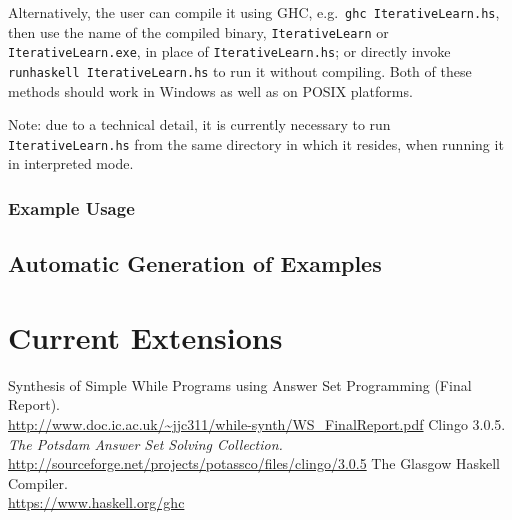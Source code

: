 \documentclass[a4paper,twoside,notitlepage,12pt]{article}
\begin{document}
\sloppy Alternatively, the user can compile it using GHC, e.g.\ 
\verb|ghc IterativeLearn.hs|, then use the name of the compiled binary,
\verb|IterativeLearn| or \verb|IterativeLearn.exe|, in place of
\verb|IterativeLearn.hs|; or directly invoke \verb|runhaskell IterativeLearn.hs|
to run it without compiling. Both of these methods should work in Windows as well
as on POSIX platforms.

Note: due to a technical detail, it is currently necessary to run 
\verb|IterativeLearn.hs| from the same directory in which it resides, when 
running it in interpreted mode.

\subsubsection{Example Usage}



\subsection{Automatic Generation of Examples} \label{sec:pgenx}

\clearpage
\section{Current Extensions}

\clearpage
\begin{thebibliography}{9}
        Synthesis of Simple While Programs using Answer Set Programming (Final Report). 
        \\ \url{http://www.doc.ic.ac.uk/~jjc311/while-synth/WS_FinalReport.pdf}
    \bibitem{clingo3}
        Clingo 3.0.5. \emph{The Potsdam Answer Set Solving Collection.}
        \\ \url{http://sourceforge.net/projects/potassco/files/clingo/3.0.5}
    \bibitem{ghc}
        The Glasgow Haskell Compiler.
        \\ \url{https://www.haskell.org/ghc}
\end{thebibliography}
\end{document}
